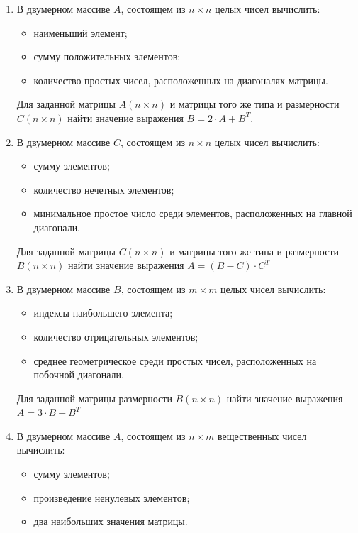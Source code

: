 \begin{enumerate}
\item В двумерном массиве $A$, состоящем из $n\times n$ целых чисел вычислить: 
\begin{itemize}
\item наименьший элемент;
\item сумму положительных элементов;
\item количество простых чисел, расположенных на диагоналях матрицы.
\end{itemize}
Для заданной матрицы $A(n\times n)$ и матрицы того же типа и размерности
$C(n\times n)$ найти значение выражения  $B=2\cdot A+B^T$.

\item В двумерном массиве $C$, состоящем из $n\times n$ целых чисел вычислить:
\begin{itemize}
\item сумму элементов;
\item количество нечетных элементов;
\item минимальное простое число среди элементов, расположенных на главной диагонали.
\end{itemize}

Для заданной матрицы $C(n\times n)$ и матрицы того же типа и размерности
$B(n\times n)$ найти значение выражения  $A=(B-C)\cdot C^T$  

\item В двумерном массиве $B$, состоящем из $m\times m$ целых чисел вычислить: 
\begin{itemize}
\item индексы наибольшего элемента;
\item количество отрицательных элементов;
\item среднее геометрическое среди простых чисел, расположенных на побочной диагонали.
\end{itemize}

Для заданной матрицы размерности $B(n\times n)$ найти значение выражения  $A=3\cdot B+B^T$  

\item В двумерном массиве $A$, состоящем из $n\times m$ вещественных чисел вычислить: 
\begin{itemize}
\item сумму элементов;
\item произведение ненулевых элементов;
\item два наибольших значения матрицы.
\end{itemize}


\end{enumerate}
